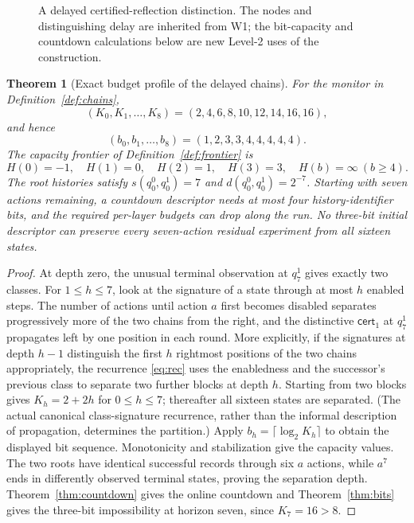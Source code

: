 \documentclass[11pt,letterpaper]{article}
\newtheorem{theorem}{Theorem}[section]
\newcommand{\cert}{\mathsf{cert}}
\begin{document}
\begin{figure}[htbp]\centering
{}
\caption{A delayed certified-reflection distinction. The nodes and distinguishing delay are inherited from W1; the bit-capacity and countdown calculations below are new Level-2 uses of the construction.}\label{fig:chains}
\end{figure}

\begin{theorem}[Exact budget profile of the delayed chains]\label{thm:chainprofile}
For the monitor in Definition~\ref{def:chains},
\[
 (K_0,K_1,\ldots,K_8)=(2,4,6,8,10,12,14,16,16),
\]
and hence
\[
 (b_0,b_1,\ldots,b_8)=(1,2,3,3,4,4,4,4,4).
\]
The capacity frontier of Definition~\ref{def:frontier} is
\[
 H(0)=-1,\quad H(1)=0,\quad H(2)=1,\quad H(3)=3,
 \quad H(b)=\infty\ (b\ge4).
\]
The root histories satisfy $s(q_0^0,q_0^1)=7$ and $d(q_0^0,q_0^1)=2^{-7}$. Starting with seven actions remaining, a countdown descriptor needs at most four history-identifier bits, and the required per-layer budgets can drop along the run. No three-bit initial descriptor can preserve every seven-action residual experiment from \emph{all sixteen states}.
\end{theorem}
\begin{proof}
At depth zero, the unusual terminal observation at $q_7^1$ gives exactly two classes. For $1\le h\le7$, look at the signature of a state through at most $h$ enabled steps. The number of actions until action $a$ first becomes disabled separates progressively more of the two chains from the right, and the distinctive $\cert_1$ at $q_7^1$ propagates left by one position in each round. More explicitly, if the signatures at depth $h-1$ distinguish the first $h$ rightmost positions of the two chains appropriately, the recurrence \eqref{eq:rec} uses the enabledness and the successor's previous class to separate two further blocks at depth $h$. Starting from two blocks gives $K_h=2+2h$ for $0\le h\le7$; thereafter all sixteen states are separated. (The actual canonical class-signature recurrence, rather than the informal description of propagation, determines the partition.) Apply $b_h=\lceil\log_2K_h\rceil$ to obtain the displayed bit sequence. Monotonicity and stabilization give the capacity values. The two roots have identical successful records through six $a$ actions, while $a^7$ ends in differently observed terminal states, proving the separation depth. Theorem~\ref{thm:countdown} gives the online countdown and Theorem~\ref{thm:bits} gives the three-bit impossibility at horizon seven, since $K_7=16>8$.
\end{proof}
\end{document}

